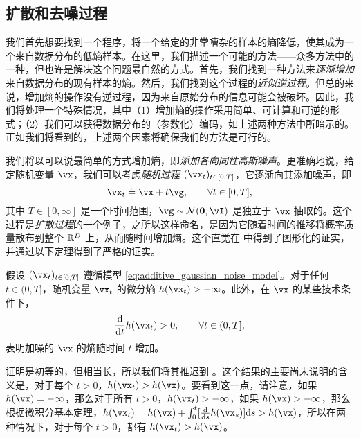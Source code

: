 \documentclass[../../book-main_zh.tex]{subfiles}
\begin{document}
\subsection{扩散和去噪过程} \label{sub:intro_diffusion_denoising}

我们首先想要找到一个程序，将一个给定的非常嘈杂的样本的熵降低，使其成为一个来自数据分布的低熵样本。在这里，我们描述一个可能的方法——众多方法中的一种，但也许是解决这个问题最自然的方式。首先，我们找到一种方法来\textit{逐渐增加}来自数据分布的现有样本的熵。然后，我们找到这个过程的\textit{近似逆过程}。但总的来说，增加熵的操作没有逆过程，因为来自原始分布的信息可能会被破坏。因此，我们将处理一个特殊情况，其中（1）增加熵的操作采用简单、可计算和可逆的形式；（2）我们可以获得数据分布的（参数化）编码，如上述两种方法中所暗示的。正如我们将看到的，上述两个因素将确保我们的方法是可行的。

我们将以可以说最简单的方式增加熵，即\textit{添加各向同性高斯噪声}。更准确地说，给定随机变量 \(\vx\)，我们可以考虑\textit{随机过程} \((\vx_{t})_{t \in [0, T]}\)，它逐渐向其添加噪声，即
\begin{equation}\label{eq:additive_gaussian_noise_model}
	\vx_{t} \doteq \vx + t\vg, \qquad \forall t \in [0, T],
\end{equation}
其中 \(T \in [0, \infty]\) 是一个时间范围，\(\vg \sim \dNorm(\vzero, \vI)\) 是独立于 \(\vx\) 抽取的。这个过程是\textit{扩散过程}的一个例子，之所以这样命名，是因为它随着时间的推移将概率质量散布到整个 \(\mathbb{R}^{D}\) 上，从而随时间增加熵。这个直觉在  中得到了图形化的证实，并通过以下定理得到了严格的证实。
\begin{theorem}
	假设 \((\vx_{t})_{t \in [0, T]}\) 遵循模型 \eqref{eq:additive_gaussian_noise_model}。对于任何 \(t \in (0, T]\)，随机变量 \(\vx_{t}\) 的微分熵 \(h(\vx_{t}) > -\infty\)。此外，在 \(\vx\) 的某些技术条件下，
	\begin{equation}
		\odv*{h(\vx_{t})}{t} > 0, \qquad \forall t \in (0, T],
	\end{equation}
	表明加噪的 \(\vx\) 的熵随时间 \(t\) 增加。
\end{theorem}
证明是初等的，但相当长，所以我们将其推迟到 。这个结果的主要尚未说明的含义是，对于每个 \(t > 0\)，\(h(\vx_{t}) > h(\vx)\)。要看到这一点，请注意，如果 \(h(\vx) = -\infty\)，那么对于所有 \(t > 0\)，\(h(\vx_{t}) > -\infty\)，如果 \(h(\vx) > -\infty\)，那么根据微积分基本定理，\(h(\vx_{t}) = h(\vx) + \int_{0}^{t}[\odv*{h(\vx_{s})}{s}]\odif{s} > h(\vx)\)，所以在两种情况下，对于每个 \(t > 0\)，都有 \(h(\vx_{t}) > h(\vx)\)。
\end{document}

